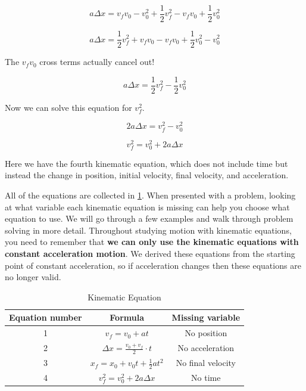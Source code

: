 \documentclass[12pt]{book}
\begin{document}
\begin{equation}
a \Delta x = v_f v_0 - v_0^2 + \frac{1}{2} v_f^2 - v_f v_0 + \frac{1}{2} v_0^2
\end{equation}

\begin{equation}
a \Delta x = \frac{1}{2} v_f^2 + v_f v_0 - v_f v_0 + \frac{1}{2} v_0^2 - v_0^2
\end{equation}

The $v_f v_0$ cross terms actually cancel out!

\begin{equation}
a \Delta x = \frac{1}{2} v_f^2 - \frac{1}{2} v_0^2
\end{equation}

Now we can solve this equation for $v_f^2$.

\begin{equation}
2 a \Delta x	 = v_f^2 - v_0^2
\end{equation}

\begin{equation}
v_f^2 = v_0^2 + 2 a \Delta x
\label{km4}
\end{equation}

Here we have the fourth kinematic equation, which does not include time but instead the change in position, initial velocity, final velocity, and acceleration.

All of the equations are collected in \ref{kmtable}. When presented with a problem, looking at what variable each kinematic equation is missing can help you choose what equation to use. We will go through a few examples and walk through problem solving in more detail. Throughout studying motion with kinematic equations, you need to remember that \textbf{we can only use the kinematic equations with constant acceleration motion}. We derived these equations from the starting point of constant acceleration, so if acceleration changes then these equations are no longer valid. 

\begin{table}[b]
\large
\centering
\caption{Kinematic Equation}
\label{kmtable}
\begin{tabular}{| c | c | c |}
	\hline
	Equation number & Formula & Missing variable \\
	\hline
	1 & $v_f = v_0 + at$ & No position \\[5pt] \hline
	2 & $\Delta x = \frac{v_0 + v_f}{2} \cdot t$ & No acceleration \\[5pt] \hline
	3 & $x_f = x_0 + v_0 t + \frac{1}{2} a t^2$ & No final velocity \\[5pt] \hline
	4 & $v_f^2 = v_0^2 + 2 a \Delta x$ & No time \\[5pt]
	\hline
\end{tabular}
\end{table}
\end{document}
